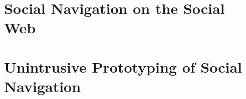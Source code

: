 \documentclass[12pt,%
               a4paper]{uiothesis}
\author{Eivind Uggedal}
\begin{document}
  \pagestyle{uio}

  \frontmatter
    \maketitle
    \clearpage
    
    \cleardoublepage
    \tableofcontents
    \clearpage
    \listoffigures
    \clearpage
    \listoftables
    \clearpage
    \listofsourcecode
    

  \mainmatter
    

    \part{Social Navigation on the Social Web}
      
      
      

    \part{Unintrusive Prototyping of Social Navigation}
      
      
      
      

    \appendixpage*

    \begin{appendices}
      
      
      
      
    \end{appendices}

  \backmatter
    
    
\end{document}
